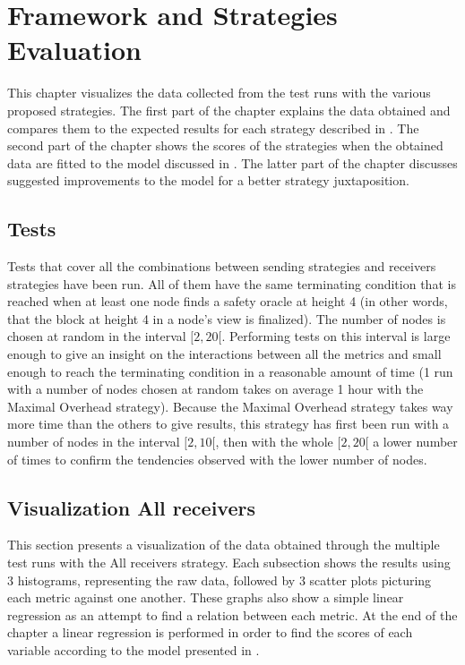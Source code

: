 \chapter{Framework and Strategies Evaluation}
\label{chap:strategies}

This chapter visualizes the data collected from the test runs with the various
proposed strategies. The first part of the chapter explains the data obtained
and compares them to the expected results for each strategy described in
. The second part of the chapter shows the scores of the
strategies when the obtained data are fitted to the model discussed in
. The latter part of the chapter discusses suggested
improvements to the model for a better strategy juxtaposition.

\section{Tests}
Tests that cover all the combinations between sending strategies and receivers
strategies have been run.  All of them have the same terminating condition that
is reached when at least one node finds a safety oracle at height 4 (in other
words, that the block at height 4 in a node's view is finalized). The number of
nodes is chosen at random in the interval \([2, 20[\). Performing tests on this
interval is large enough to give an insight on the interactions between all the
metrics and small enough to reach the terminating condition in a reasonable
amount of time (1 run with a number of nodes chosen at random takes on average 1
hour with the Maximal Overhead strategy). Because the Maximal Overhead strategy
takes way more time than the others to give results, this strategy has first
been run with a number of nodes in the interval \([2,10[\), then with the whole
\([2, 20[\) a lower number of times to confirm the tendencies observed with the
lower number of nodes.

\section{Visualization All receivers}
This section presents a visualization of the data obtained through the multiple
test runs with the All receivers strategy.  Each subsection shows the results
using 3 histograms, representing the raw data, followed by 3 scatter plots
picturing each metric against one another. These graphs also show a simple linear
regression as an attempt to find a relation between each metric. At the end of
the chapter a linear regression is performed in order to
find the scores of each variable according to the model presented in
.


